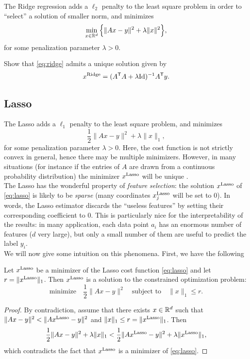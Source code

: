 \documentclass[11pt,nocut]{article}
\begin{document}
The Ridge regression adds a $\ell_2$ penalty to the least square problem in order to ``select'' a solution of smaller norm, and minimizes
\begin{equation}\label{eq:ridge}
	\min_{x \in \mathbb{R}^d} \Big\{ \| Ax - y \|^2 + \lambda \|x\|^2 \Big\},
\end{equation}
for some penalization parameter $\lambda >0$.
\begin{exercise}
	Show that \eqref{eq:ridge} admits a unique solution given by
	$$
	x^{\rm Ridge} = (A^{{\sf T}} A + \lambda {{\rm Id}})^{-1} A^{{\sf T}} y.
	$$
\end{exercise}

\subsection{Lasso}\label{sec:lasso}

The Lasso adds a $\ell_1$ penalty to the least square problem, and minimizes
\begin{equation}\label{eq:lasso}
\frac{1}{2} \| Ax - y \|^2 + \lambda \|x\|_1,
\end{equation}
for some penalization parameter $\lambda >0$.
Here, the cost function is not strictly convex in general, hence there may be multiple minimizers. However, in many situations (for instance if the entries of $A$ are drawn from a continuous probability distribution) the minimizer $x^{\rm Lasso}$ will be unique \cite{tibshirani2013lasso}.
\\

The Lasso has the wonderful property of \emph{feature selection}: the solution $x^{\rm Lasso}$ of \eqref{eq:lasso} is likely to be \emph{sparse} (many coordinates $x^{\rm Lasso}_j$ will be set to $0$).
In words, the Lasso estimator discards the ``useless features'' by setting their corresponding coefficient to $0$. 
This is particularly nice for the interpretability of the results: in many application, each data point $a_i$ has an enormous number of features ($d$ very large), but only a small number of them are useful to predict the label $y_i$.
\\

We will now give some intuition on this phenomena. First, we have the following

\begin{lemma}\label{lem:ball}
	Let $x^{\rm Lasso}$ be a minimizer of the Lasso cost function \eqref{eq:lasso} and let $r=\|x^{\rm Lasso}\|_1$. Then $x^{\rm Lasso}$ is a solution to the constrained optimization problem:
	$$
	\text{minimize} \quad \frac{1}{2} \|Ax-y\|^2 \quad
	\text{subject to} \quad \|x\|_1 \leq r.
	$$
\end{lemma}
\begin{proof}
	By contradiction, assume that there exists $x \in \mathbb{R}^d$ such that $\|Ax -y\|^2 < \|Ax^{\rm Lasso}-y\|^2$ and $\|x\|_1 \leq r = \|x^{\rm Lasso}\|_1$. Then
	$$
\frac{1}{2} \| Ax - y \|^2 + \lambda \|x\|_1 
< 
\frac{1}{2} \| Ax^{\rm Lasso} - y \|^2 + \lambda \|x^{\rm Lasso}\|_1,
$$
which contradicts the fact that $x^{\rm Lasso}$ is a minimizer of \eqref{eq:lasso}.
\end{proof}
\\
\end{document}

